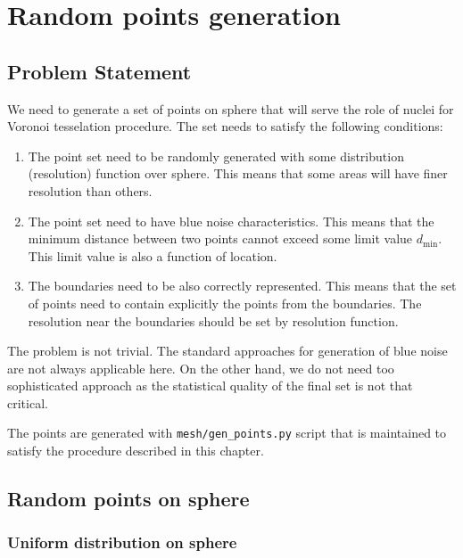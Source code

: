 
\chapter{Random points generation}



\section{Problem Statement}

We need to generate a set of points on sphere that will serve the role
of nuclei for Voronoi tesselation procedure. The set needs to satisfy
the following conditions:
\begin{enumerate}
\item
  The point set need to be randomly generated with some distribution
  (resolution) function over sphere. This means that some areas will
  have finer resolution than others.
\item
  The point set need to have blue noise characteristics. This means
  that the minimum distance between two points cannot exceed some
  limit value $d_{\min}$. This limit value is also a function of
  location.
\item
  The boundaries need to be also correctly represented. This means
  that the set of points need to contain explicitly the points from
  the boundaries. The resolution near the boundaries should be set by
  resolution function.
\end{enumerate}

The problem is not trivial. The standard approaches for generation of
blue noise are not always applicable here. On the other hand, we do
not need too sophisticated approach as the statistical quality of the
final set is not that critical.

The points are generated with \texttt{mesh/gen\_points.py} script that
is maintained to satisfy the procedure described in this chapter.


\section{Random points on sphere}


\subsection{Uniform distribution on sphere}\label{sec:marsaglia}

